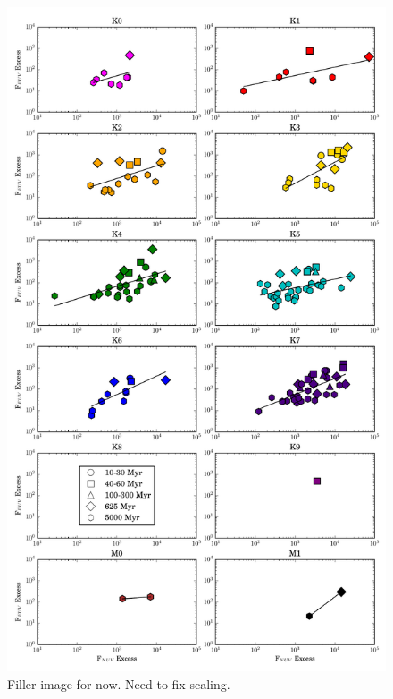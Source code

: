 \documentclass[twocolumn]{aastex62}
\begin{document}
\begin{figure}[h]
\centering
\includegraphics[height=\textheight]{nuv_vs_fuv_10_NO_J_Kspt.pdf}
\caption{Filler image for now. Need to fix scaling. \label{fig:nuv_vs_fuv}}
\end{figure}
\end{document}
